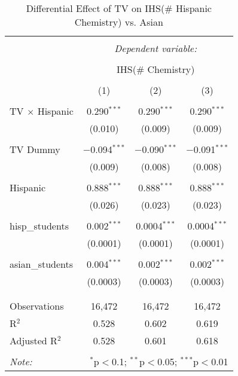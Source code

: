 
\begin{table}[!htbp] \centering 
  \caption{Differential Effect of TV on IHS(\# Hispanic Chemistry) vs. Asian} 
  \label{} 
\begin{tabular}{@{\extracolsep{-2pt}}lccc} 
\\[-1.8ex]\hline 
\hline \\[-1.8ex] 
 & \multicolumn{3}{c}{\textit{Dependent variable:}} \\ 
\cline{2-4} 
\\[-1.8ex] & \multicolumn{3}{c}{IHS(\# Chemistry)} \\ 
\\[-1.8ex] & (1) & (2) & (3)\\ 
\hline \\[-1.8ex] 
 TV $\times$ Hispanic & 0.290$^{***}$ & 0.290$^{***}$ & 0.290$^{***}$ \\ 
  & (0.010) & (0.009) & (0.009) \\ 
  & & & \\ 
 TV Dummy & $-$0.094$^{***}$ & $-$0.090$^{***}$ & $-$0.091$^{***}$ \\ 
  & (0.009) & (0.008) & (0.008) \\ 
  & & & \\ 
 Hispanic & 0.888$^{***}$ & 0.888$^{***}$ & 0.888$^{***}$ \\ 
  & (0.026) & (0.023) & (0.023) \\ 
  & & & \\ 
 hisp\_students & 0.002$^{***}$ & 0.0004$^{***}$ & 0.0004$^{***}$ \\ 
  & (0.0001) & (0.0001) & (0.0001) \\ 
  & & & \\ 
 asian\_students & 0.004$^{***}$ & 0.002$^{***}$ & 0.002$^{***}$ \\ 
  & (0.0003) & (0.0003) & (0.0003) \\ 
  & & & \\ 
\hline \\[-1.8ex] 
Observations & 16,472 & 16,472 & 16,472 \\ 
R$^{2}$ & 0.528 & 0.602 & 0.619 \\ 
Adjusted R$^{2}$ & 0.528 & 0.601 & 0.618 \\ 
\hline 
\hline \\[-1.8ex] 
\textit{Note:}  & \multicolumn{3}{r}{$^{*}$p$<$0.1; $^{**}$p$<$0.05; $^{***}$p$<$0.01} \\ 
\end{tabular} 
\end{table} 
